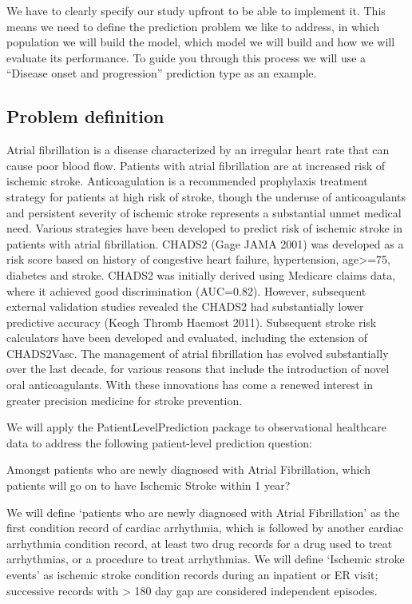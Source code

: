 \documentclass[]{article}
\begin{document}
We have to clearly specify our study upfront to be able to implement it.
This means we need to define the prediction problem we like to address,
in which population we will build the model, which model we will build
and how we will evaluate its performance. To guide you through this
process we will use a ``Disease onset and progression'' prediction type
as an example.

\subsection{Problem definition}\label{problem-definition}

Atrial fibrillation is a disease characterized by an irregular heart
rate that can cause poor blood flow. Patients with atrial fibrillation
are at increased risk of ischemic stroke. Anticoagulation is a
recommended prophylaxis treatment strategy for patients at high risk of
stroke, though the underuse of anticoagulants and persistent severity of
ischemic stroke represents a substantial unmet medical need. Various
strategies have been developed to predict risk of ischemic stroke in
patients with atrial fibrillation. CHADS2 (Gage JAMA 2001) was developed
as a risk score based on history of congestive heart failure,
hypertension, age\textgreater{}=75, diabetes and stroke. CHADS2 was
initially derived using Medicare claims data, where it achieved good
discrimination (AUC=0.82). However, subsequent external validation
studies revealed the CHADS2 had substantially lower predictive accuracy
(Keogh Thromb Haemost 2011). Subsequent stroke risk calculators have
been developed and evaluated, including the extension of CHADS2Vasc. The
management of atrial fibrillation has evolved substantially over the
last decade, for various reasons that include the introduction of novel
oral anticoagulants. With these innovations has come a renewed interest
in greater precision medicine for stroke prevention.

We will apply the PatientLevelPrediction package to observational
healthcare data to address the following patient-level prediction
question:

Amongst patients who are newly diagnosed with Atrial Fibrillation, which
patients will go on to have Ischemic Stroke within 1 year?

We will define `patients who are newly diagnosed with Atrial
Fibrillation' as the first condition record of cardiac arrhythmia, which
is followed by another cardiac arrhythmia condition record, at least two
drug records for a drug used to treat arrhythmias, or a procedure to
treat arrhythmias. We will define `Ischemic stroke events' as ischemic
stroke condition records during an inpatient or ER visit; successive
records with \textgreater{} 180 day gap are considered independent
episodes.
\end{document}
